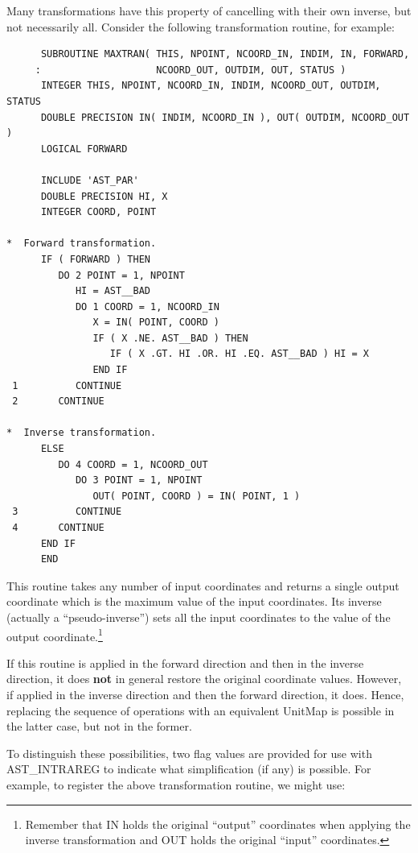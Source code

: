 \documentclass[twoside,11pt]{article}
\newcommand{\htmlref}[2]{#1}
\begin{document}
Many transformations have this property of cancelling with their own
inverse, but not necessarily all. Consider the following
transformation routine, for example:

\small
\begin{verbatim}
      SUBROUTINE MAXTRAN( THIS, NPOINT, NCOORD_IN, INDIM, IN, FORWARD,
     :                    NCOORD_OUT, OUTDIM, OUT, STATUS )
      INTEGER THIS, NPOINT, NCOORD_IN, INDIM, NCOORD_OUT, OUTDIM, STATUS
      DOUBLE PRECISION IN( INDIM, NCOORD_IN ), OUT( OUTDIM, NCOORD_OUT )
      LOGICAL FORWARD

      INCLUDE 'AST_PAR'
      DOUBLE PRECISION HI, X
      INTEGER COORD, POINT

*  Forward transformation.
      IF ( FORWARD ) THEN
         DO 2 POINT = 1, NPOINT
            HI = AST__BAD
            DO 1 COORD = 1, NCOORD_IN
               X = IN( POINT, COORD )
               IF ( X .NE. AST__BAD ) THEN
                  IF ( X .GT. HI .OR. HI .EQ. AST__BAD ) HI = X
               END IF
 1          CONTINUE
 2       CONTINUE

*  Inverse transformation.
      ELSE
         DO 4 COORD = 1, NCOORD_OUT
            DO 3 POINT = 1, NPOINT
               OUT( POINT, COORD ) = IN( POINT, 1 )
 3          CONTINUE
 4       CONTINUE
      END IF
      END
\end{verbatim}
\normalsize

This routine takes any number of input coordinates and returns a
single output coordinate which is the maximum value of the input
coordinates. Its inverse (actually a ``pseudo-inverse'') sets all the
input coordinates to the value of the output
coordinate.\footnote{Remember that IN holds the original ``output''
coordinates when applying the inverse transformation and OUT holds the
original ``input'' coordinates.}

If this routine is applied in the forward direction and then in the
inverse direction, it does {\bf{not}} in general restore the original
coordinate values. However, if applied in the inverse direction and
then the forward direction, it does. Hence, replacing the sequence of
operations with an equivalent UnitMap is possible in the latter case,
but not in the former.

To distinguish these possibilities, two flag values are provided for
use with \htmlref{AST\_INTRAREG}{AST_INTRAREG} to indicate what simplification (if any) is
possible. For example, to register the above transformation routine,
we might use:
\end{document}
